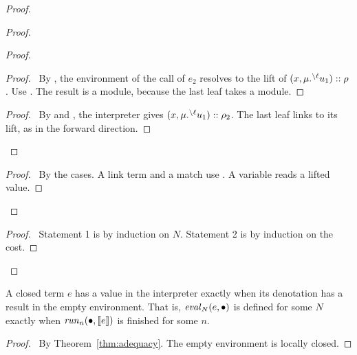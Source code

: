 \begin{proof}
\begin{proof}
\begin{proof}
      \begin{proof}
        \pf\ By , the environment of the call of $e_2$ resolves to the lift of $(x,\mu.{\prescript{\backslash{\ell}}{}{u_1}})::\rho$.
        Use .
        The result is a module, because the last leaf takes a module.
      \end{proof}
      \qedstep
      \begin{proof}
        \pf\ By  and , the interpreter gives $(x,\mu.{\prescript{\backslash{\ell}}{}{u_1}})::\rho_2$.
        The last leaf links to its lift, as in the forward direction.
      \end{proof}
    \end{proof}
    \qedstep
    \begin{proof}
      \pf\ By the cases.
      A link term and a match use .
      A variable reads a lifted value.
    \end{proof}
  \end{proof}
  \qedstep
  \begin{proof}
    \pf\ Statement 1 is  by induction on $N$.
    Statement 2 is  by induction on the cost.
  \end{proof}
\end{proof}

\begin{cor}[Termination]\label{cor:termination}
  A closed term $e$ has a value in the interpreter exactly when its denotation has a result in the empty environment.
  That is, $\mathit{eval}_{N}(e,\bullet)$ is defined for some $N$ exactly when $\mathit{run}_{n}(\bullet,\llbracket{e}\rrbracket)$ is finished for some $n$.
\end{cor}
\begin{proof}
  \pf\ By Theorem~\ref{thm:adequacy}.
  The empty environment is locally closed.
\end{proof}
